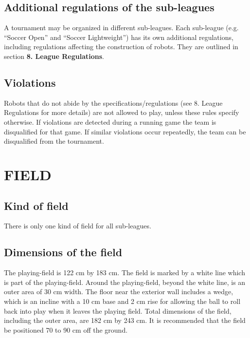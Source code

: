 \documentclass{article}
\begin{document}
\textbf{}

\subsection{ Additional regulations of the sub-leagues \label{ref-026}}

A tournament may be organized in different sub-leagues. Each sub-league (e.g. ``Soccer Open'' and ``Soccer Lightweight'') has its own additional regulations, including regulations affecting the construction of robots. They are outlined in section \textbf{8. League Regulations}.

\subsection{ Violations \label{ref-027}}

Robots that do not abide by the specifications/regulations (see 8. League Regulations for more details) are not allowed to play, unless these rules specify otherwise. If violations are detected during a running game the team is disqualified for that game. If similar violations occur repeatedly, the team can be disqualified from the tournament.

\section{FIELD \label{ref-028}}

\subsection{ Kind of field \label{ref-029}}

There is only one kind of field for all sub-leagues.

\subsection{ Dimensions of the field \label{ref-030}}

The playing-field is 122 cm by 183 cm. The field is marked by a white line which is part of the playing-field. Around the playing-field, beyond the white line, is an outer area of 30 cm width. The floor near the exterior wall includes a wedge, which is an incline with a 10 cm base and 2 cm rise for allowing the ball to roll back into play when it leaves the playing field. Total dimensions of the field, including the outer area, are 182 cm by 243 cm. It is recommended that the field be positioned 70 to 90 cm off the ground.
\end{document}
